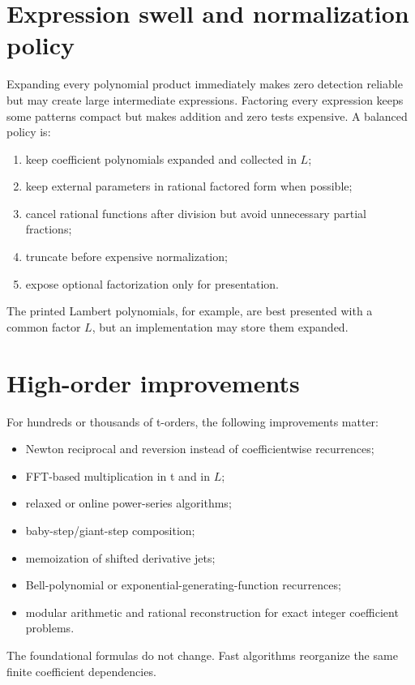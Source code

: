 \documentclass[11pt,openany]{book}
\theoremstyle{definition}
\theoremstyle{plain}
\theoremstyle{remark}
\begin{document}
\section{Expression swell and normalization policy}
Expanding every polynomial product immediately makes zero detection reliable
but may create large intermediate expressions.  Factoring every expression
keeps some patterns compact but makes addition and zero tests expensive.  A
balanced policy is:
\begin{enumerate}
\item keep coefficient polynomials expanded and collected in \(L\);
\item keep external parameters in rational factored form when possible;
\item cancel rational functions after division but avoid unnecessary partial
      fractions;
\item truncate before expensive normalization;
\item expose optional factorization only for presentation.
\end{enumerate}
The printed Lambert polynomials, for example, are best presented with a common
factor \(L\), but an implementation may store them expanded.

\section{High-order improvements}
For hundreds or thousands of t-orders, the following improvements matter:
\begin{itemize}
\item Newton reciprocal and reversion instead of coefficientwise recurrences;
\item FFT-based multiplication in t and in \(L\);
\item relaxed or online power-series algorithms;
\item baby-step/giant-step composition;
\item memoization of shifted derivative jets;
\item Bell-polynomial or exponential-generating-function recurrences;
\item modular arithmetic and rational reconstruction for exact integer
      coefficient problems.
\end{itemize}
The foundational formulas do not change.  Fast algorithms reorganize the same
finite coefficient dependencies.
\end{document}
